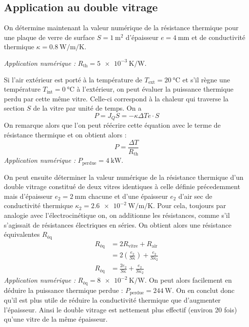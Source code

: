 \documentclass[a4paper,12pt]{article}
\begin{document}
\subsection{Application au double vitrage}

On détermine maintenant la valeur numérique de la résistance thermique pour une plaque de verre de surface ${S = \SI{1}{\metre\squared}}$ d'épaisseur ${e=\SI{4}{\milli\metre}}$ et de conductivité thermique ${\kappa = \SI{0.8}{\watt\per\metre\per\kelvin}}$.

\noindent \emph{Application numérique : } $R_\text{th} = \SI{5e-3}{\kelvin\per\watt}$.

Si l'air extérieur est porté à la température de ${T_\text{ext} = \SI{20}{\celsius}}$ et s'il règne une température ${T_\text{int} = \SI{0}{\celsius}}$ à l'extérieur, on peut évaluer la puissance thermique perdu par cette même vitre. Celle-ci correspond à la chaleur qui traverse la section $S$ de la vitre par unité de temps. On a
\begin{equation}
	P = J_Q S = -\kappa{\Delta T}{e} \cdot S
\end{equation}
On remarque alors que l'on peut réécrire cette équation avec le terme de résistance thermique et on obtient alors :
\begin{equation}
	P = \frac{\Delta T}{R_\text{th}}
\end{equation}
\emph{Application numérique : } $P_\text{perdue} = \SI{4}{\kilo\watt}$.

On peut ensuite déterminer la valeur numérique de la résistance thermique d'un double vitrage constitué de deux vitres identiques à celle définie précedemment mais d'épaisseur ${e_2 = \SI{2}{\milli\metre}}$ chacune et d'une épaisseur $e_2$ d'air sec de conductivité thermique ${\kappa_2 = \SI{2.6e-2}{\watt\per\metre\per\kelvin}}$. Pour cela, toujours par analogie avec l'électrocinétique on, on additionne les résistances, comme s'il s'agissait de résistances électriques en séries. On obtient alors une résistance équivalentes $R_\text{éq}$
\begin{equation}
	\begin{split}
		R_\text{éq} 	&= 2R_\text{vitre} + R_\text{air}\\
						&= 2 \left( \frac{e_2}{S\kappa} \right) + \frac{e_2}{S\kappa_2}\\
		R_\text{éq}		&= \frac{2e_2}{S\kappa} + \frac{e_2}{S\kappa_2}
	\end{split}
\end{equation}
\emph{Application numérique : } $R_\text{éq} = \SI{8e-2}{\kelvin\per\watt}$. On peut alors facilement en déduire la puissance thermique perdue : ${P_\text{perdue} = \SI{244}{\watt}}$. On en conclut donc qu'il est plus utile de réduire la conductivité thermique que d'augmenter l'épaisseur. Ainsi le double vitrage est nettement plus effectif (environ 20 fois) qu'une vitre de la même épaisseur.
\end{document}
